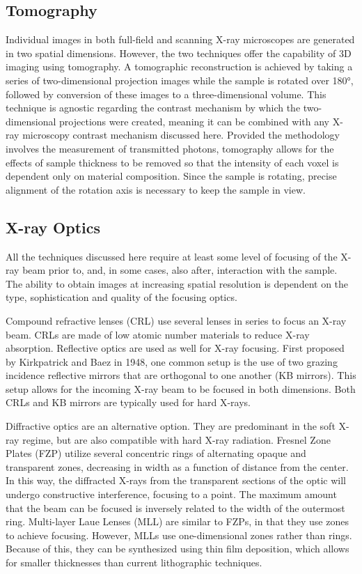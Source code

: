 \documentclass[journal=cmatex,manuscript=perspective]{achemso}
\begin{document}
\subsection{Tomography}

Individual images in both full-field and scanning X-ray microscopes
are generated in two spatial dimensions. However, the two techniques
offer the capability of 3D imaging using tomography. A tomographic
reconstruction is achieved by taking a series of two-dimensional
projection images while the sample is rotated over \ang{180}, followed
by conversion of these images to a three-dimensional volume. This technique is
agnostic regarding the contrast mechanism by which the two-dimensional
projections were created, meaning it can be combined with any X-ray
microscopy contrast mechanism discussed here. Provided the methodology
involves the measurement of transmitted photons, tomography allows for
the effects of sample thickness to be removed so that the intensity of
each voxel is dependent only on material composition. Since the sample
is rotating, precise alignment of the rotation axis is necessary to
keep the sample in view.

\subsection{X-ray Optics}

All the techniques discussed here require at least some level of
focusing of the X-ray beam prior to, and, in some cases, also after,
interaction with the sample. The ability to obtain images at
increasing spatial resolution is dependent on the type, sophistication
and quality of the focusing optics.

Compound refractive lenses (CRL) use several lenses in series to focus an X-ray
beam. CRLs are made of low atomic number materials to reduce X-ray
absorption\cite{lengeler1996}. Reflective
optics are used as well for X-ray focusing. First proposed by Kirkpatrick and Baez in 1948, one common setup is the use of two grazing incidence reflective mirrors that are orthogonal to
one another (KB mirrors). This setup allows for the incoming X-ray beam to be
focused in both dimensions. Both CRLs
and KB mirrors are typically used for hard X-rays\cite{kirkpatrick1948}.

Diffractive optics are an alternative option. They are predominant in
the soft X-ray regime, but are also compatible with hard X-ray
radiation. Fresnel Zone Plates (FZP) utilize several concentric rings
of alternating opaque and transparent zones, decreasing in width as a function of distance from the center. In this way, the
diffracted X-rays from the transparent sections of the optic will
undergo constructive interference, focusing to a point. The maximum amount that the beam can be focused is inversely related to the width of the outermost ring.  Multi-layer Laue Lenses (MLL) are similar to
FZPs, in that they use zones to achieve focusing. However, MLLs use
one-dimensional zones rather than rings. Because of this, they can be
synthesized using thin film deposition, which allows for smaller
thicknesses than current lithographic
techniques\cite{synchrotronradiation,lblzoneplate}.
\end{document}
